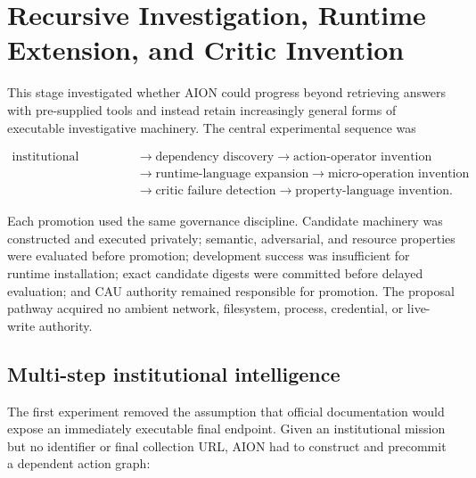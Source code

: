 \section{Recursive Investigation, Runtime Extension, and Critic Invention}
\label{sec:recursive-investigation-invention}

This stage investigated whether AION could progress beyond retrieving answers
with pre-supplied tools and instead retain increasingly general forms of
executable investigative machinery.  The central experimental sequence was

\begin{equation}
\label{eq:recursive-invention-chain}
\begin{aligned}
\text{institutional objective}
&\rightarrow \text{dependency discovery}
\rightarrow \text{action-operator invention} \\
&\rightarrow \text{runtime-language expansion}
\rightarrow \text{micro-operation invention} \\
&\rightarrow \text{critic failure detection}
\rightarrow \text{property-language invention}.
\end{aligned}
\end{equation}

Each promotion used the same governance discipline.  Candidate machinery was
constructed and executed privately; semantic, adversarial, and resource
properties were evaluated before promotion; development success was
insufficient for runtime installation; exact candidate digests were committed
before delayed evaluation; and CAU authority remained responsible for
promotion.  The proposal pathway acquired no ambient network, filesystem,
process, credential, or live-write authority.

\subsection{Multi-step institutional intelligence}
\label{subsec:multistep-institutional-intelligence}

The first experiment removed the assumption that official documentation would
expose an immediately executable final endpoint.  Given an institutional
mission but no identifier or final collection URL, AION had to construct and
precommit a dependent action graph:

